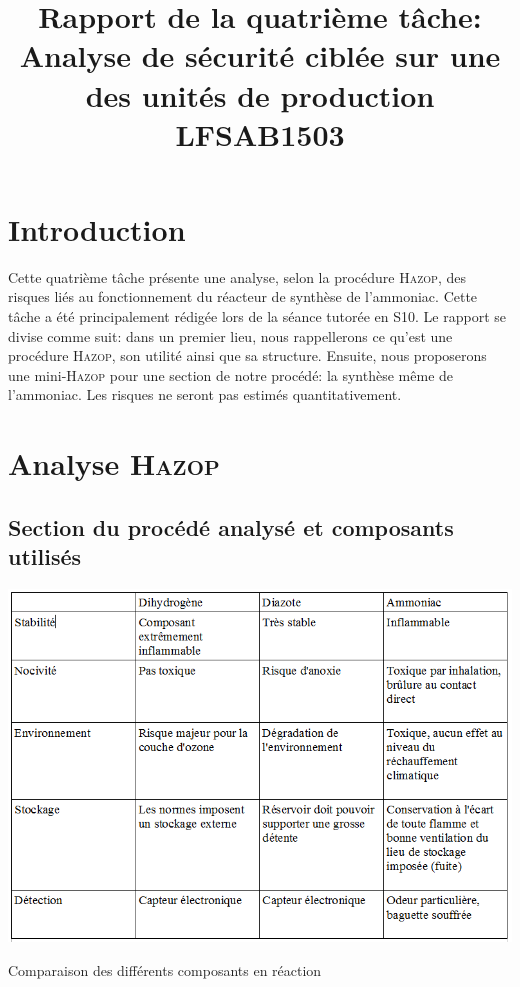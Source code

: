 
\title{\vspace{\fill}\begin{LARGE} \begin{bf}
Rapport de la quatrième tâche: Analyse de sécurité ciblée sur une des unités de production\\
LFSAB1503 \\
\end{bf}\end{LARGE}
\vspace{\fill}}

\maketitle
\newpage
\tableofcontents
\newpage
\newpage
\section{Introduction}

	Cette quatrième tâche présente une analyse, selon la procédure \textsc{Hazop}, des risques liés au fonctionnement 
du réacteur de synthèse de l’ammoniac. Cette tâche a été principalement rédigée lors de la séance tutorée en S10. Le rapport 
se divise comme suit: dans un premier lieu, nous rappellerons ce qu'est une procédure \textsc{Hazop}, son utilité ainsi 
que sa structure. Ensuite, nous proposerons une mini-\textsc{Hazop} pour une section de notre procédé: la synthèse même 
de l'ammoniac. Les risques ne seront pas estimés quantitativement.

\section{Analyse \textsc{Hazop}}

\subsection{Section du procédé analysé et composants utilisés}

\begin{table}[ht!]
 \centering
 \includegraphics[scale=0.6]{TabComp.PNG}
 \caption{Comparaison des différents composants en réaction}
 \label{TabComp}
\end{table}

